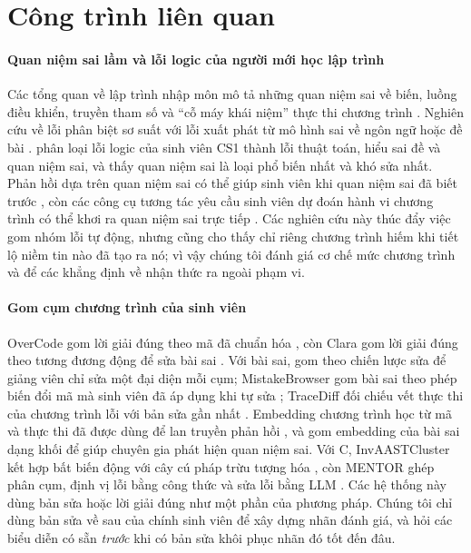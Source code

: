 \section{Công trình liên quan}\label{sec:related}

\paragraph{Quan niệm sai lầm và lỗi logic của người mới học lập trình}
Các tổng quan về lập trình nhập môn mô tả những quan niệm sai về biến, luồng điều khiển, truyền tham số và ``cỗ máy khái niệm'' thực thi chương trình \citep{sorva2013notional,qian2017misconceptions}. Nghiên cứu về lỗi phân biệt sơ suất với lỗi xuất phát từ mô hình sai về ngôn ngữ hoặc đề bài \citep{altadmri2015compilations,hermans2021brain}. \citet{ettles2018logic} phân loại lỗi logic của sinh viên CS1 thành lỗi thuật toán, hiểu sai đề và quan niệm sai, và thấy quan niệm sai là loại phổ biến nhất và khó sửa nhất. Phản hồi dựa trên quan niệm sai có thể giúp sinh viên khi quan niệm sai đã biết trước \citep{gusukuma2018misconception}, còn các công cụ tương tác yêu cầu sinh viên dự đoán hành vi chương trình có thể khơi ra quan niệm sai trực tiếp \citep{lu2024smol}. Các nghiên cứu này thúc đẩy việc gom nhóm lỗi tự động, nhưng cũng cho thấy chỉ riêng chương trình hiếm khi tiết lộ niềm tin nào đã tạo ra nó; vì vậy chúng tôi đánh giá cơ chế mức chương trình và để các khẳng định về nhận thức ra ngoài phạm vi.

\paragraph{Gom cụm chương trình của sinh viên}
OverCode gom lời giải đúng theo mã đã chuẩn hóa \citep{glassman2015overcode}, còn Clara gom lời giải đúng theo tương đương động để sửa bài sai \citep{gulwani2018clara}. Với bài sai, \citet{kaleeswaran2016semisupervised} gom theo chiến lược sửa để giảng viên chỉ sửa một đại diện mỗi cụm; MistakeBrowser gom bài sai theo phép biến đổi mã mà sinh viên đã áp dụng khi tự sửa \citep{head2017mistakebrowser}; TraceDiff đối chiếu vết thực thi của chương trình lỗi với bản sửa gần nhất \citep{suzuki2017tracediff}. Embedding chương trình học từ mã và thực thi đã được dùng để lan truyền phản hồi \citep{piech2015embeddings}, và \citet{shi2021misconception} gom embedding của bài sai dạng khối để giúp chuyên gia phát hiện quan niệm sai. Với C, InvAASTCluster kết hợp bất biến động với cây cú pháp trừu tượng hóa \citep{orvalho2025invaast}, còn MENTOR ghép phân cụm, định vị lỗi bằng công thức và sửa lỗi bằng LLM \citep{orvalho2026mentor}. Các hệ thống này dùng bản sửa hoặc lời giải đúng như một phần của phương pháp. Chúng tôi chỉ dùng bản sửa về sau của chính sinh viên để xây dựng nhãn đánh giá, và hỏi các biểu diễn có sẵn \emph{trước} khi có bản sửa khôi phục nhãn đó tốt đến đâu.

